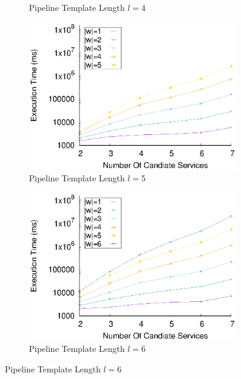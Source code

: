 \begin{figure}[!ht]
\begin{subfigure}{0.45\textwidth}
        \caption{Pipeline Template Length $l$$=$4}
        \label{fig:time_window_perce_wide_4n}
      \end{subfigure}
      \hfill
      \begin{subfigure}{0.45\textwidth}
        \includegraphics[width=\textwidth]{Images/graphs/window_time_performance_qualitative_n7_s7_50_80_n5}
        \caption{Pipeline Template Length $l$$=$5}
        \label{fig:time_window_perce_wide_5n}
      \end{subfigure}
      \hfill
      \begin{subfigure}{0.45\textwidth}
        \includegraphics[width=\textwidth]{Images/graphs/window_time_performance_qualitative_n7_s7_50_80_n6}
        \caption{Pipeline Template Length $l$$=$6}
        \label{fig:time_window_perce_wide_6n}
      \end{subfigure}

\end{figure}
